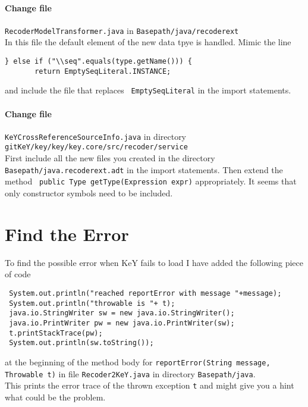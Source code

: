 \documentclass[11pt]{article}
\begin{document}
\paragraph{Change file} \verb+RecoderModelTransformer.java+ in 
\verb+Basepath/java/recoderext+\\[5pt]
In this file the default element of the new data tpye is handled.
Mimic the line
\begin{verbatim}
} else if ("\\seq".equals(type.getName())) {
       return EmptySeqLiteral.INSTANCE;
\end{verbatim}
and include the file that replaces \verb+ EmptySeqLiteral+ in the import statements.


 \paragraph{Change file} \verb+KeYCrossReferenceSourceInfo.java+ in directory\\[5pt]
\verb+gitKeY/key/key/key.core/src/recoder/service+\\[5pt]
First include all the new files you created in the directory\\
\verb+Basepath/java.recoderext.adt+ in the import statements. Then extend the method
\verb+ public Type getType(Expression expr)+ appropriately.
It seems that only constructor  symbols need to be included.


\section{Find the Error}
To find the possible error when KeY fails to load I have added the following piece of code
\begin{verbatim}
 System.out.println("reached reportError with message "+message); 
 System.out.println("throwable is "+ t); 
 java.io.StringWriter sw = new java.io.StringWriter();
 java.io.PrintWriter pw = new java.io.PrintWriter(sw);
 t.printStackTrace(pw);
 System.out.println(sw.toString());
\end{verbatim}
at the beginning of the method body for 
\verb+reportError(String message, Throwable t)+ in file
\verb+Recoder2KeY.java+ in directory \verb+Basepath/java+.\\
This prints the error trace of the thrown exception \verb+t+ and might
give you a hint what could be the problem.
\end{document}
